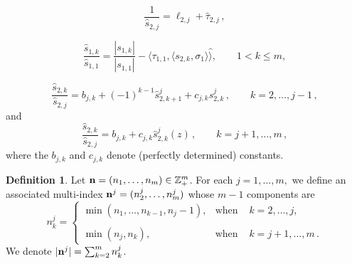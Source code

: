 \documentclass[10pt,a4paper]{article}
\theoremstyle{definition}
\newtheorem{definition}[theorem]{Definition}
\theoremstyle{remark}
\numberwithin{equation}{section}
\begin{document}
\begin{equation}\label{eq:k}
\frac{1}{\widehat{s}_{2,j}} = \ell_{2,j} +
\widehat{\tau}_{2,j}\,,
\end{equation}

\begin{equation} \label{4.4}
\frac{\widehat{s}_{1,k}}{\widehat{s}_{1,1}} =
\frac{|s_{1,k}|}{|s_{1,1}|} - \langle \tau_{1,1},\langle s_{2,k},\sigma_1
\rangle \widehat{\rangle}  , \qquad  1 < k \leq m,
\end{equation}



\begin{equation}\label{eq:l}
\frac{\widehat{s}_{2,k} }{\widehat{s}_{2,j} } = b_{j,k} +
  (-1)^{k-1}\widehat{s}_{2,k+1}^j  + c_{j,k} \widehat{s}_{2,k}^j  \,, \qquad k=
2,\ldots,j-1\,,
\end{equation}
and
\begin{equation}\label{eq:m}
\frac{\widehat{s}_{2,k}}{\widehat{s}_{2,j}} = b_{j,k} +
c_{j,k}\widehat{s}_{2,k}^j(z) \,, \qquad k =j+1,\ldots,m\,,
\end{equation}
where the $b_{j,k} $ and $c_{j,k}$ denote (perfectly determined) constants.


\begin{definition} \label{asociado} Let ${\bf n}=(n_1, \ldots, n_m) \in
{\mathbb{Z}}_+^m$. For each $j=1, \ldots, m,$ we define an
associated multi-index ${{\bf n}}^j=(n^j_{2}, \ldots, n^j_{m})$
whose $m-1$ components are
\[
n^j_k= \left\{ \begin{array}{lcl} \min (n_1, \ldots , n_{k-1}, n_j-1),& \mbox{when } & k=2, \ldots ,j,\\ & \\
                                     \min (n_j,  n_k), & \mbox{when } & k=j+1, \ldots, m\,.
\end{array}
\right.
\]
We denote $|{{\bf n}}^j|= \sum_{k=2}^m n^j_{k} $.
\end{definition}
\end{document}
